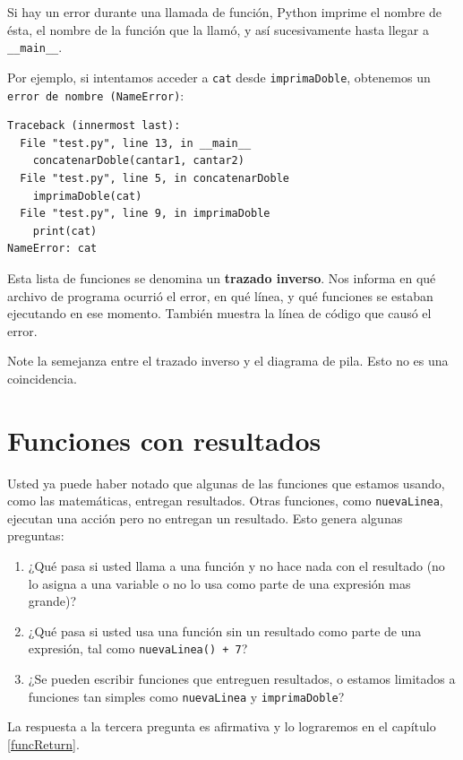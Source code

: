 Si hay un error durante una llamada de función, Python imprime el
nombre de ésta, el nombre de la función que la llamó, y así sucesivamente
hasta llegar a \texttt{\_\_main\_\_}.

Por ejemplo, si intentamos acceder a \texttt{cat} desde \texttt{imprimaDoble},
obtenemos un \texttt{error de nombre (NameError)}:
\begin{verbatim}
Traceback (innermost last):
  File "test.py", line 13, in __main__
    concatenarDoble(cantar1, cantar2)
  File "test.py", line 5, in concatenarDoble
    imprimaDoble(cat)
  File "test.py", line 9, in imprimaDoble
    print(cat)
NameError: cat
\end{verbatim}
Esta lista de funciones se denomina un \textbf{trazado inverso}. Nos
informa en qué archivo de programa ocurrió el error, en qué línea,
y qué funciones se estaban ejecutando en ese momento. También muestra
la línea de código que causó el error.


Note la semejanza entre el trazado inverso y el diagrama de pila.
Esto no es una coincidencia.

\section{Funciones con resultados}

Usted ya puede haber notado que algunas de las funciones que estamos
usando, como las matemáticas, entregan resultados. Otras funciones,
como \texttt{nuevaLinea}, ejecutan una acción pero no entregan un
resultado. Esto genera algunas preguntas:
\begin{enumerate}
\item ¿Qué pasa si usted llama a una función y no hace nada con el resultado
(no lo asigna a una variable o no lo usa como parte de una expresión
mas grande)?
\item ¿Qué pasa si usted usa una función sin un resultado como parte de
una expresión, tal como \texttt{nuevaLinea() + 7}?
\item ¿Se pueden escribir funciones que entreguen resultados, o estamos
limitados a funciones tan simples como \texttt{nuevaLinea} y \texttt{imprimaDoble}?
\end{enumerate}
La respuesta a la tercera pregunta es afirmativa y lo lograremos en
el capítulo \ref{funcReturn}.

